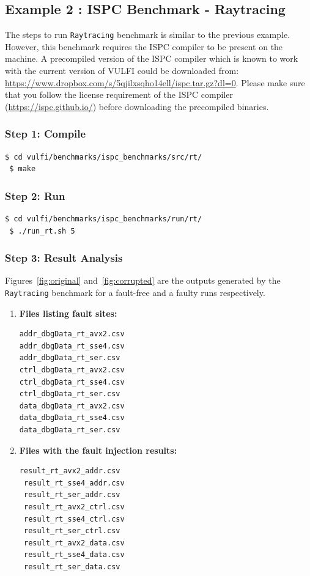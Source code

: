 \documentclass[12pt,a4paper]{article}
\begin{document}
\subsection{Example 2 : ISPC Benchmark - Raytracing }
\label{ex2-rt}

The steps to run \texttt{Raytracing} benchmark is similar to the previous example. However, this benchmark requires
the ISPC compiler\cite{ispc12,ispcwebref}
to be present on the machine.
%
%
A precompiled version of the ISPC compiler which is known to work with the current version of VULFI could be downloaded from:
\url{https://www.dropbox.com/s/5qjilxsqho14ell/ispc.tar.gz?dl=0}.
%
%
Please make sure that you follow the license requirement of the ISPC compiler (\url{https://ispc.github.io/})
before downloading the precompiled binaries.
%
%

\subsubsection{Step 1: Compile}
\begin{Verbatim}[fontsize=\relsize{-1},frame=single,framerule=0.1mm]
 $ cd vulfi/benchmarks/ispc_benchmarks/src/rt/
 $ make
 \end{Verbatim}
 
\subsubsection{Step 2: Run}
 \begin{Verbatim}[fontsize=\relsize{-1},frame=single,framerule=0.1mm]
 $ cd vulfi/benchmarks/ispc_benchmarks/run/rt/
 $ ./run_rt.sh 5
 \end{Verbatim}
 
\subsubsection{Step 3: Result Analysis}
Figures~\ref{fig:original} and~\ref{fig:corrupted} are the outputs 
generated by the \texttt{Raytracing} benchmark for a fault-free
and a faulty runs respectively.

\begin{enumerate}
 \item \textbf{Files listing fault sites: }
 \begin{Verbatim}[fontsize=\relsize{-1},frame=single,framerule=0.1mm]
addr_dbgData_rt_avx2.csv
addr_dbgData_rt_sse4.csv
addr_dbgData_rt_ser.csv
ctrl_dbgData_rt_avx2.csv
ctrl_dbgData_rt_sse4.csv
ctrl_dbgData_rt_ser.csv
data_dbgData_rt_avx2.csv
data_dbgData_rt_sse4.csv
data_dbgData_rt_ser.csv
 \end{Verbatim}
 \item \textbf{Files with the fault injection results: }
 \begin{Verbatim}[fontsize=\relsize{-1},frame=single,framerule=0.1mm]
result_rt_avx2_addr.csv
 result_rt_sse4_addr.csv
 result_rt_ser_addr.csv
 result_rt_avx2_ctrl.csv
 result_rt_sse4_ctrl.csv
 result_rt_ser_ctrl.csv
 result_rt_avx2_data.csv
 result_rt_sse4_data.csv
 result_rt_ser_data.csv
 \end{Verbatim}
 
\end{enumerate}
\end{document}

